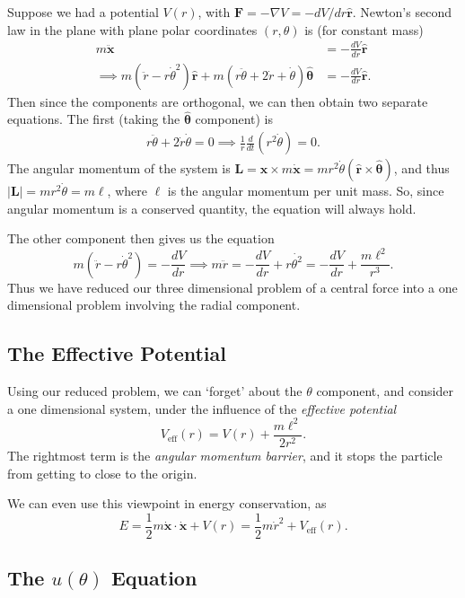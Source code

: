 \documentclass[11pt, a4paper]{scrartcl}
\newcommand{\vv}[1]{\boldsymbol{\mathbf{#1}}}
\theoremstyle{definition}
\newcommand{\hh}[1]{\hat{\vv{#1}}}
\begin{document}
Suppose we had a potential $V(r)$, with $\vv F = - \nabla V = - dV/dr \hh r$. Newton's second law in the plane with plane polar coordinates $(r, \theta)$ is (for constant mass)
\begin{align*}
	m \ddot{\vv x} &= - \frac{dV}{dr} \hh r \\
\implies m (\ddot{r} - r \dot{\theta}^2) \hh r + m (r \ddot{\theta} + 2 \dot{r} + \dot{\theta}) \hh \theta &= -\frac{dV}{dr} \hh r.
\end{align*}
Then since the components are orthogonal, we can then obtain two separate equations. The first (taking the $\hh \theta$ component) is
\begin{align*}
	r \ddot{\theta} + 2 \dot{r} \dot{\theta} = 0 \implies \frac{1}{r} \frac{d}{dt}(r^2 \dot{\theta}) = 0.
\end{align*}
The angular momentum of the system is $\vv L = \vv x \times m \dot{\vv x} = m r^2 \dot{\theta} (\hh r \times \hh \theta)$, and thus $|\vv L| = m r^2 \dot{\theta} = m \ell$, where $\ell$ is the angular momentum per unit mass. So, since angular momentum is a conserved quantity, the equation will always hold.

The other component then gives us the equation
$$
m(\ddot{r} - r \dot{\theta}^2) = - \frac{dV}{dr} \implies m \ddot{r} = -\frac{dV}{dr} + r \dot{\theta^2} = - \frac{dV}{dr} + \frac{m\ell^2}{r^3}.
$$
Thus we have reduced our three dimensional problem of a central force into a one dimensional problem involving the radial component. 

\subsection*{The Effective Potential}

Using our reduced problem, we can `forget' about the $\theta$ component, and consider a one dimensional system, under the influence of the \emph{effective potential}
$$
V_{\text{eff}}(r) = V(r) + \frac{m \ell^2}{2r^2}.
$$
The rightmost term is the \emph{angular momentum barrier}, and it stops the particle from getting to close to the origin.

We can even use this viewpoint in energy conservation, as
$$
E = \frac{1}{2}m \dot{\vv x} \cdot \dot{\vv x} + V(r) = \frac{1}{2}m \dot{r}^2 + V_{\text{eff}}(r).
$$

\subsection*{The $u(\theta)$ Equation}
\end{document}
